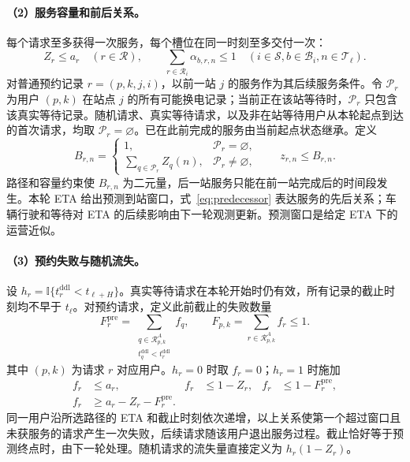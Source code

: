 \documentclass[12pt,a4paper,UTF8]{ctexart}
\numberwithin{equation}{section}
\newcommand{\ind}{\mathbb I}
\newcommand{\R}{\mathcal R}
\begin{document}
\paragraph{（2）服务容量和前后关系。}
每个请求至多获得一次服务，每个槽位在同一时刻至多交付一次：
\begin{equation}
Z_r\le a_r\quad(r\in\R),\qquad
\sum_{r\in\R_i}\alpha_{b,r,n}\le1
\quad(i\in\mathcal S,b\in\mathcal B_i,n\in\mathcal T_\ell).
\label{eq:assignment_capacity}
\end{equation}
对普通预约记录 $r=(p,k,j,i)$，以前一站 $j$ 的服务作为其后续服务条件。令 $\mathcal P_r$ 为用户 $(p,k)$ 在站点 $j$ 的所有可能换电记录；当前正在该站等待时，$\mathcal P_r$ 只包含该真实等待记录。随机请求、真实等待请求，以及非在站等待用户从本轮起点到达的首次请求，均取 $\mathcal P_r=\varnothing$。已在此前完成的服务由当前起点状态继承。定义
\begin{equation}
B_{r,n}=\begin{cases}
1,&\mathcal P_r=\varnothing,\\
\displaystyle\sum_{q\in\mathcal P_r}Z_q(n),&\mathcal P_r\ne\varnothing,
\end{cases}
\qquad z_{r,n}\le B_{r,n}.
\label{eq:predecessor}
\end{equation}
路径和容量约束使 $B_{r,n}$ 为二元量，后一站服务只能在前一站完成后的时间段发生。本轮 ETA 给出预测到站窗口，式~\eqref{eq:predecessor} 表达服务的先后关系；车辆行驶和等待对 ETA 的后续影响由下一轮观测更新。预测窗口是给定 ETA 下的运营近似。

\paragraph{（3）预约失败与随机流失。}
设 $h_r=\ind\{t_r^{\mathrm{ddl}}<t_{\ell+H}\}$。真实等待请求在本轮开始时仍有效，所有记录的截止时刻均不早于 $t_\ell$。对预约请求，定义此前截止的失败数量
\begin{equation}
F_r^{\mathrm{pre}}=
\sum_{\substack{q\in\R_{p,k}^A\\t_q^{\mathrm{ddl}}<t_r^{\mathrm{ddl}}}}f_q,
\qquad
F_{p,k}=\sum_{r\in\R_{p,k}^A}f_r\le1.
\label{eq:failure_order}
\end{equation}
其中 $(p,k)$ 为请求 $r$ 对应用户。$h_r=0$ 时取 $f_r=0$；$h_r=1$ 时施加
\begin{equation}
\begin{aligned}
f_r&\le a_r,& f_r&\le1-Z_r,& f_r&\le1-F_r^{\mathrm{pre}},\\
f_r&\ge a_r-Z_r-F_r^{\mathrm{pre}}.
\end{aligned}
\label{eq:failure_exact}
\end{equation}
同一用户沿所选路径的 ETA 和截止时刻依次递增，以上关系使第一个超过窗口且未获服务的请求产生一次失败，后续请求随该用户退出服务过程。截止恰好等于预测终点时，由下一轮处理。随机请求的流失量直接定义为 $h_r(1-Z_r)$。
\end{document}
